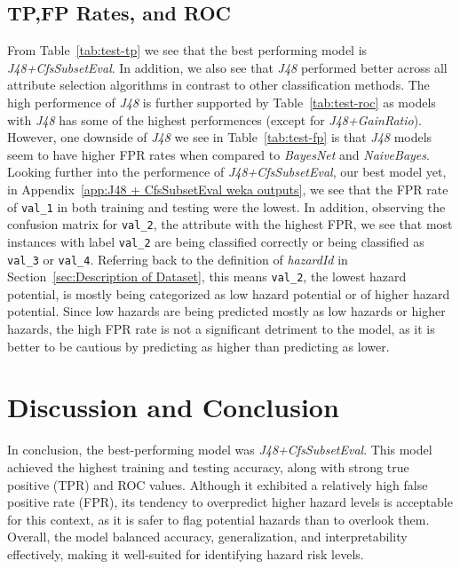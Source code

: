 \documentclass{article}
\begin{document}
\subsection{TP,FP Rates, and ROC}
From Table~\ref{tab:test-tp} we see that the best performing model is \textit{J48+CfsSubsetEval}. 
In addition, we also see that \textit{J48} performed better across all attribute selection algorithms in contrast to other classification methods. 
The high performence of \textit{J48} is further supported by Table~\ref{tab:test-roc} as models with \textit{J48} has some of the highest performences (except for \textit{J48+GainRatio}). 
However, one downside of \textit{J48} we see in Table~\ref{tab:test-fp} is that \textit{J48} models seem to have higher FPR rates when compared to \textit{BayesNet} and \textit{NaiveBayes}. 
Looking further into the performence of \textit{J48+CfsSubsetEval}, our best model yet, in Appendix~\ref{app:J48 + CfsSubsetEval weka outputs}, we see that the FPR rate of \verb|val_1| in both training and testing were the lowest. 
In addition, observing the confusion matrix for \verb|val_2|, the attribute with the highest FPR, we see that most instances with label \verb|val_2| are being classified correctly or being classified as \verb|val_3| or \verb|val_4|. 
Referring back to the definition of \textit{hazardId} in Section~\ref{sec:Description of Dataset}, this means \verb|val_2|, the lowest hazard potential, is mostly being categorized as low hazard potential or of higher hazard potential. 
Since low hazards are being predicted mostly as low hazards or higher hazards, the high FPR rate is not a significant detriment to the model, as it is better to be cautious by predicting as higher than predicting as lower. 

\section{Discussion and Conclusion}
In conclusion, the best-performing model was \textit{J48+CfsSubsetEval}. 
This model achieved the highest training and testing accuracy, along with strong true positive (TPR) and ROC values. 
Although it exhibited a relatively high false positive rate (FPR), its tendency to overpredict higher hazard levels is acceptable for this context, as it is safer to flag potential hazards than to overlook them. 
Overall, the model balanced accuracy, generalization, and interpretability effectively, making it well-suited for identifying hazard risk levels.
\end{document}
